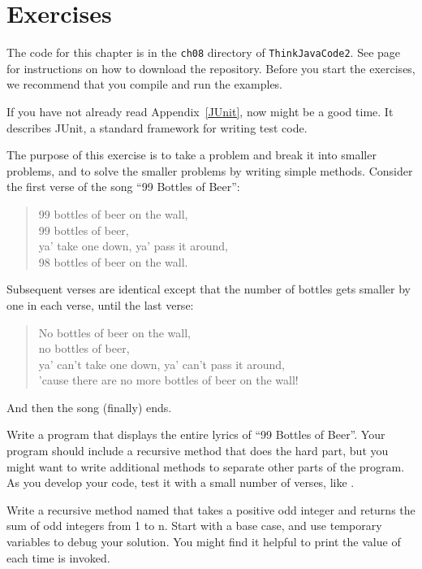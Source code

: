\section{Exercises}

The code for this chapter is in the {\tt ch08} directory of {\tt ThinkJavaCode2}.
See page~\pageref{code} for instructions on how to download the repository.
Before you start the exercises, we recommend that you compile and run the examples.

If you have not already read Appendix~\ref{JUnit}, now might be a good time.
It describes JUnit, a standard framework for writing test code.


\begin{exercise}  %

The purpose of this exercise is to take a problem and break it into smaller problems, and to solve the smaller problems by writing simple methods.
Consider the first verse of the song ``99 Bottles of Beer'':

\begin{quote}
99 bottles of beer on the wall,\\
99 bottles of beer,\\
ya' take one down, ya' pass it around,\\
98 bottles of beer on the wall.
\end{quote}

Subsequent verses are identical except that the number of bottles gets smaller by one in each verse, until the last verse:

\begin{quote}
No bottles of beer on the wall,\\
no bottles of beer,\\
ya' can't take one down, ya' can't pass it around,\\
'cause there are no more bottles of beer on the wall!
\end{quote}

And then the song (finally) ends.

Write a program that displays the entire lyrics of ``99 Bottles of Beer''.
Your program should include a recursive method that does the hard part, but you might want to write additional methods to separate other parts of the program.
As you develop your code, test it with a small number of verses, like .

\end{exercise}


\begin{exercise}  %

Write a recursive method named  that takes a positive odd integer  and returns the sum of odd integers from 1 to n.
Start with a base case, and use temporary variables to debug your solution.
You might find it helpful to print the value of  each time  is invoked.

\end{exercise}


